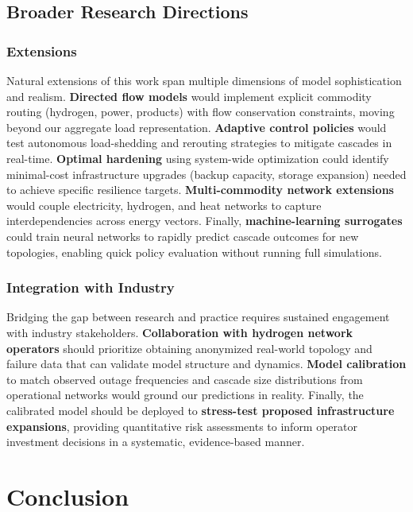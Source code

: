 \documentclass[12pt,a4paper,twoside]{report}
\begin{document}
\section{Broader Research Directions}

\subsection{Extensions}

Natural extensions of this work span multiple dimensions of model sophistication and realism. \textbf{Directed flow models} would implement explicit commodity routing (hydrogen, power, products) with flow conservation constraints, moving beyond our aggregate load representation. \textbf{Adaptive control policies} would test autonomous load-shedding and rerouting strategies to mitigate cascades in real-time. \textbf{Optimal hardening} using system-wide optimization could identify minimal-cost infrastructure upgrades (backup capacity, storage expansion) needed to achieve specific resilience targets. \textbf{Multi-commodity network extensions} would couple electricity, hydrogen, and heat networks to capture interdependencies across energy vectors. Finally, \textbf{machine-learning surrogates} could train neural networks to rapidly predict cascade outcomes for new topologies, enabling quick policy evaluation without running full simulations.

\subsection{Integration with Industry}

Bridging the gap between research and practice requires sustained engagement with industry stakeholders. \textbf{Collaboration with hydrogen network operators} should prioritize obtaining anonymized real-world topology and failure data that can validate model structure and dynamics. \textbf{Model calibration} to match observed outage frequencies and cascade size distributions from operational networks would ground our predictions in reality. Finally, the calibrated model should be deployed to \textbf{stress-test proposed infrastructure expansions}, providing quantitative risk assessments to inform operator investment decisions in a systematic, evidence-based manner.

\chapter{Conclusion}
\end{document}
